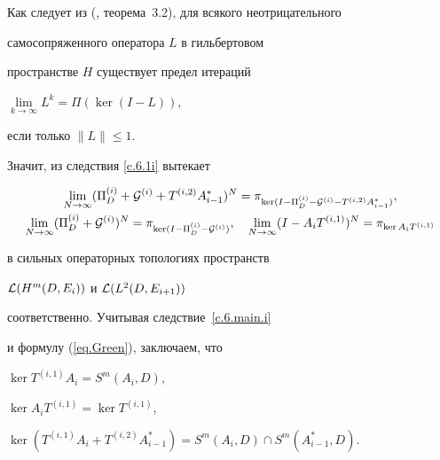 \begin{pf}


Как следует из (\cite{NaSh}, теорема~3.2), для всякого неотрицательного


самосопряженного оператора $L$ в гильбертовом


пространстве $H$ существует предел итераций


$\lim\limits_{k \to \infty} L^k=\Pi (\ker (I-L)) $,


если только $\| L\| \leq 1$.


Значит, из следствия \ref{c.6.1i} вытекает


\begin{gather*}


\lim_{N \to \infty}


(\Pi ^{(i)}_{D}+{\cal G}^{(i)}+T^{(i,2)}


A^*_{i-1})^{N}=\pi_{\ker (


I - \Pi ^{(i)}_{D} - {\cal G}^{(i)} - T^{(i,2)}


A^*_{i-1})} ,\\


%


\lim_{N \to \infty}


(\Pi ^{(i)}_{D}+{\cal G}^{(i)})^{N}= \pi_{\ker (


I - \Pi ^{(i)}_{D} - {\cal G}^{(i)})}, \quad


\lim_{N \to \infty}


(I - A_i T^{(i,1)})^{N}=\pi_{\ker A_i T^{(i,1)} }


\end{gather*}


в сильных операторных топологиях пространств


${\cal L} (H^{m} (D, E_i))$ и ${\cal L} (L^{2} (D, E_{i+1}))$


соответственно. Учитывая следствие~\ref{c.6.main.i}


и формулу (\ref{eq.Green}), заключаем, что


$\ker T^{(i,1)} A_i=S ^m (A_i, D)$,


$\ker A_i T^{(i,1)}=\ker T^{(i,1)} $,


$\ker (T^{(i,1)} A_i+T^{(i,2)} A^*_{i-1})=


S ^m (A_i, D) \cap S ^m (A^*_{i-1}, D)$.


\end{pf}








